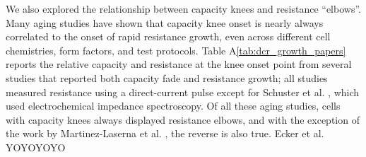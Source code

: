 \documentclass[journal=jpclcd,manuscript=article]{achemso}
\newcommand{\gbox}[1]{{
\fbox{
\parbox{0.8\textwidth}{  \fbox{$\triangleright$\textcolor{blue}{\textbf{Gon}:}} 
#1
}}}}
\begin{document}

We also explored the relationship between capacity knees and resistance ``elbows''.
Many aging studies have shown that capacity knee onset is nearly always correlated to the onset of rapid resistance growth, even across different cell chemistries, form factors, and test protocols. Table A\ref{tab:dcr_growth_papers} reports the relative capacity and resistance at the knee onset point from several studies that reported both capacity fade and resistance growth; all studies measured resistance using a direct-current pulse except for Schuster et al. \cite{schuster_nonlinear_2015}, which used electrochemical impedance spectroscopy. Of all these aging studies, cells with capacity knees always displayed resistance elbows, and with the exception of the work by Martinez-Laserna et al. \cite{martinez-laserna_technical_2018}, the reverse is also true. Ecker et al.\cite{ecker_calendar_2014}
YOYOYOYO
\end{document}
